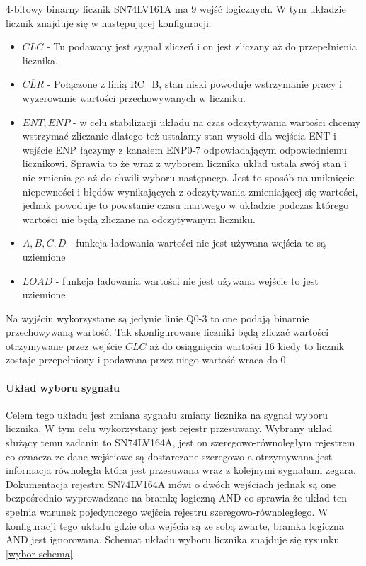\documentclass[a4paper,12pt]{article}
\begin{document}
4-bitowy binarny licznik SN74LV161A ma 9 wejść logicznych. 
W tym układzie licznik znajduje się w następującej konfiguracji:
\begin{itemize}
        \item $CLC$ - Tu podawany jest sygnał zliczeń i on jest zliczany aż do przepełnienia licznika.
        \item $\overline{CLR}$ - Połączone z linią RC\_B, stan niski powoduje wstrzymanie pracy i wyzerowanie wartości przechowywanych w liczniku. 
        \item $ENT,ENP$ - w celu stabilizacji układu na czas odczytywania wartości chcemy wstrzymać zliczanie dlatego też ustalamy stan wysoki dla wejścia ENT i wejście ENP łączymy z kanałem ENP0-7 odpowiadającym odpowiedniemu licznikowi.
        Sprawia to że wraz z wyborem licznika układ ustala swój stan i nie zmienia go aż do chwili wyboru następnego. 
        Jest to sposób na uniknięcie niepewności i błędów wynikających z odczytywania zmieniającej się wartości, jednak powoduje to powstanie czasu martwego w układzie podczas którego wartości nie będą zliczane na odczytywanym liczniku.
        \item $A,B,C,D$ - funkcja ładowania wartości nie jest używana wejścia te są uziemione
        \item $\overline{LOAD}$ - funkcja ładowania wartości nie jest używana wejście to jest uziemione
\end{itemize} 

Na wyjściu wykorzystane są jedynie linie Q0-3 to one podają binarnie przechowywaną wartość. 
Tak skonfigurowane liczniki będą zliczać wartości otrzymywane przez wejście $CLC$ aż do osiągnięcia wartości 16 kiedy to licznik zostaje przepełniony i podawana przez niego wartość wraca do 0. 

\paragraph{Układ wyboru sygnału}

Celem tego układu jest zmiana sygnału zmiany licznika na sygnał wyboru licznika. W tym celu wykorzystany jest rejestr przesuwany. 
Wybrany układ służący temu zadaniu to SN74LV164A\cite{shift doc}, jest on szeregowo-równoległym rejestrem co oznacza ze dane wejściowe są dostarczane szeregowo a otrzymywana jest informacja równoległa która jest przesuwana wraz z kolejnymi sygnałami zegara. Dokumentacja rejestru SN74LV164A mówi o dwóch wejściach jednak są one bezpośrednio wyprowadzane na bramkę logiczną AND co sprawia że układ ten spełnia warunek pojedynczego wejścia rejestru szeregowo-równoległego. W konfiguracji tego układu gdzie oba wejścia są ze sobą zwarte, bramka logiczna AND jest ignorowana.
Schemat układu wyboru licznika znajduje się rysunku \ref{wybor schema}. 
\end{document}
